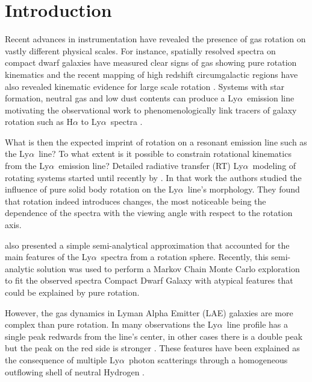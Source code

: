 \documentclass[a4paper,fleqn,usenatbib]{mnras}
\newcommand{\lya}{\ifmmode{{\rm Ly}\alpha}\else Ly$\alpha$\ \fi}
\begin{document}


\section{Introduction}
\label{sec:intro}

Recent advances in instrumentation have revealed the presence of gas
rotation on vastly different physical scales.
For instance, spatially resolved spectra on compact dwarf galaxies
have measured clear signs of gas showing pure rotation kinematics
\citep{2015A&A...577A..21C,2017A&A...600A.125C} and the recent mapping of
high redshift circumgalactic regions have also revealed kinematic
evidence for large scale rotation \citep{2018MNRAS.473.3907A}.
Systems with star formation, neutral gas and low dust
contents can produce a \lya emission line \citep{PartridgePeebles}
motivating the observational work to phenomenologically link tracers
of galaxy rotation such as H$\alpha$ to \lya spectra
\citep[e.g.][]{Herenz2016}.  

What is then the expected imprint of rotation on a resonant emission
line such as the \lya line? To what extent is it possible to constrain
rotational kinematics from the \lya emission line? 
Detailed radiative transfer (RT) \lya modeling of rotating systems
started until recently by \cite{Garavito14}.
In that work the authors studied the influence of pure solid body
rotation on the \lya line's morphology.
They found that rotation indeed introduces changes, the most
noticeable being the dependence of the spectra with the viewing
angle with respect to the rotation axis. 

\cite{Garavito14} also presented a simple semi-analytical
approximation that accounted for the main features of the \lya spectra
from a rotation sphere.
Recently, this semi-analytic solution was used to perform a Markov
Chain Monte Carlo exploration to fit the observed spectra Compact
Dwarf Galaxy \citep{tololo} with atypical features that could be
explained by pure rotation.  

However, the gas dynamics in Lyman Alpha Emitter (LAE) galaxies are
more complex than pure rotation.
In many observations the \lya line profile has a single peak
redwards from the line's center, in other cases there is a double peak
but the peak on the red side is stronger
\citep[e.g.][]{2010ApJ...717..289S,Erb14,Trainor16}.   
These features have been explained as the consequence of multiple
\lya photon scatterings through a homogeneous outflowing shell of
neutral Hydrogen
\citep{2006A&A...460..397V,Orsi12,2015ApJ...812..123G}.  
\end{document}
